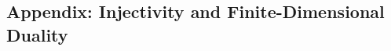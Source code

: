 \documentclass[main.tex]{subfiles}
\begin{document}
\newpage
\subsection{Appendix: Injectivity and Finite-Dimensional Duality}
\label{subsec:matrix-ordered-spaces-appendix}

\end{document}
